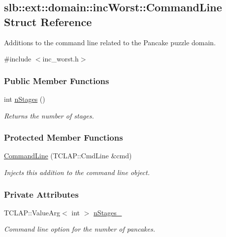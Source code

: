 \hypertarget{structslb_1_1ext_1_1domain_1_1incWorst_1_1CommandLine}{}\subsection{slb\+:\+:ext\+:\+:domain\+:\+:inc\+Worst\+:\+:Command\+Line Struct Reference}
\label{structslb_1_1ext_1_1domain_1_1incWorst_1_1CommandLine}


Additions to the command line related to the Pancake puzzle domain.  




{\ttfamily \#include $<$inc\+\_\+worst.\+h$>$}

\subsubsection*{Public Member Functions}
\begin{DoxyCompactItemize}
\item 
int \hyperlink{structslb_1_1ext_1_1domain_1_1incWorst_1_1CommandLine_a7df05c621218d114c39c582cf6c1f183}{n\+Stages} ()
\begin{DoxyCompactList}\small\item\em Returns the number of stages. \end{DoxyCompactList}\end{DoxyCompactItemize}
\subsubsection*{Protected Member Functions}
\begin{DoxyCompactItemize}
\item 
\hyperlink{structslb_1_1ext_1_1domain_1_1incWorst_1_1CommandLine_a870bea6c7ad59cc21fa30f663953bc49}{Command\+Line} (T\+C\+L\+A\+P\+::\+Cmd\+Line \&cmd)
\begin{DoxyCompactList}\small\item\em Injects this addition to the command line object. \end{DoxyCompactList}\end{DoxyCompactItemize}
\subsubsection*{Private Attributes}
\begin{DoxyCompactItemize}
\item 
T\+C\+L\+A\+P\+::\+Value\+Arg$<$ int $>$ \hyperlink{structslb_1_1ext_1_1domain_1_1incWorst_1_1CommandLine_aac068cb2b8b923f43e38c0802d7e8b67}{n\+Stages\+\_\+}\hypertarget{structslb_1_1ext_1_1domain_1_1incWorst_1_1CommandLine_aac068cb2b8b923f43e38c0802d7e8b67}{}\label{structslb_1_1ext_1_1domain_1_1incWorst_1_1CommandLine_aac068cb2b8b923f43e38c0802d7e8b67}

\begin{DoxyCompactList}\small\item\em Command line option for the number of pancakes. \end{DoxyCompactList}\end{DoxyCompactItemize}


